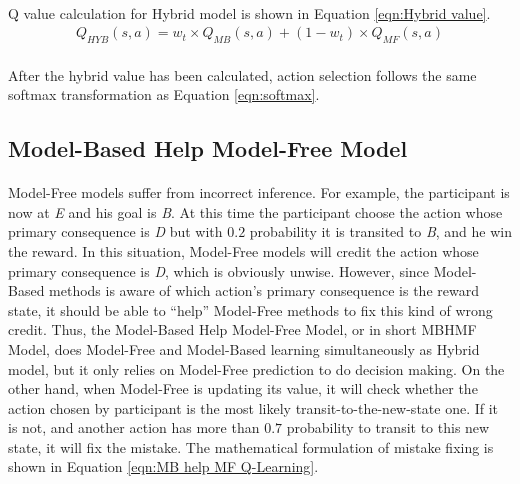 \paragraph{}
Q value calculation for Hybrid model is shown in Equation \ref{eqn:Hybrid value}. 
\begin{equation}
\begin{aligned}
Q_{HYB}(s,a)=w_t\times Q_{MB}(s,a)+(1-w_t)\times Q_{MF}(s,a)
\end{aligned}
\label{eqn:Hybrid value}
\end{equation}

\paragraph{}
After the hybrid value has been calculated, action selection follows the same softmax transformation as Equation \ref{eqn:softmax}. 


\subsection{Model-Based Help Model-Free Model}
\label{sec:Model-Based Help Model-Free Model}
\paragraph{}
Model-Free models suffer from incorrect inference. For example, the participant is now at \emph{E} and his  goal is \emph{B}. At this time the participant choose the action whose primary consequence is \emph{D} but with $0.2$ probability it is transited to \emph{B}, and he win the reward. In this situation, Model-Free models will credit the action whose primary consequence is \emph{D}, which is obviously unwise. However, since Model-Based methods is aware of which action's primary consequence is the reward state, it should be able to \enquote{help} Model-Free methods to fix this kind of wrong credit. Thus, the Model-Based Help Model-Free Model, or in short MBHMF Model, does Model-Free and Model-Based learning simultaneously as Hybrid model, but it only relies on Model-Free prediction to do decision making. On the other hand, when Model-Free is updating its value, it will check whether the action chosen by participant is the most likely transit-to-the-new-state one. If it is not, and another action has more than $0.7$ probability to transit to this new state, it will fix the mistake. The mathematical formulation of mistake fixing is shown in Equation \ref{eqn:MB help MF Q-Learning}. 

